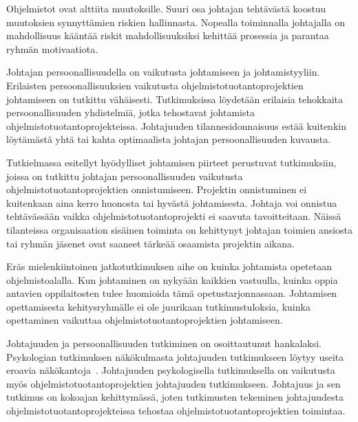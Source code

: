 \documentclass[finnish]{tktltiki2}
\theoremstyle{definition}
\theoremstyle{remark}
\begin{document}
Ohjelmistot ovat alttiita muutoksille. Suuri osa johtajan tehtävästä koostuu muutoksien synnyttämien riskien hallinnasta. Nopealla toiminnalla johtajalla on mahdollisuus kääntää riskit mahdollisuuksiksi kehittää prosessia ja parantaa ryhmän motivaatiota.

Johtajan persoonallisuudella on vaikutusta johtamiseen ja johtamistyyliin. Erilaisten persoonallisuuksien vaikutusta ohjelmistotuotantoprojektien johtamiseen on tutkittu vähäisesti. Tutkimuksissa löydetään erilaisia tehokkaita persoonallisuuden yhdistelmiä, jotka tehostavat johtamista ohjelmistotuotantoprojekteissa. Johtajuuden tilannesidonnaisuus estää kuitenkin löytämästä yhtä tai kahta optimaalista johtajan persoonallisuuden kuvausta.

Tutkielmassa esitellyt hyödylliset johtamisen piirteet perustuvat tutkimuksiin, joissa on tutkittu johtajan persoonallisuuden vaikutusta ohjelmistotuotantoprojektien onnistumiseen. Projektin onnistuminen ei kuitenkaan aina kerro huonosta tai hyvästä johtamisesta. Johtaja voi onnistua tehtävässään vaikka ohjelmistotuotantoprojekti ei saavuta tavoitteitaan. Näissä tilanteissa organisaation sisäinen toiminta on kehittynyt johtajan toimien ansiosta tai ryhmän jäsenet ovat saaneet tärkeää osaamista projektin aikana.

Eräs mielenkiintoinen jatkotutkimuksen aihe on kuinka johtamista opetetaan ohjelmistoalalla. Kun johtaminen on nykyään kaikkien vastuulla, kuinka oppia antavien oppilaitosten tulee huomioida tämä opetustarjonnassaan. Johtamisen opettamisesta kehitysryhmälle ei ole juurikaan tutkimustuloksia, kuinka opettaminen vaikuttaa ohjelmistotuotantoprojektien johtamiseen.

Johtajuuden ja persoonallisuuden tutkiminen on osoittautunut hankalaksi. Psykologian tutkimuksen näkökulmasta johtajuuden tutkimukseen löytyy useita eroavia näkökantoja~\cite{haslam2011}. Johtajuuden psykologisella tutkimuksella on vaikutusta myös ohjelmistotuotantoprojektien johtajuuden tutkimukseen. Johtajuus ja sen tutkimus on kokoajan kehittymässä, joten tutkimusten tekeminen johtajuudesta ohjelmistotuotantoprojekteissa tehostaa ohjelmistotuotantoprojektien toimintaa.   

   

\newpage 



 











%

%
% 
%



\end{document}
